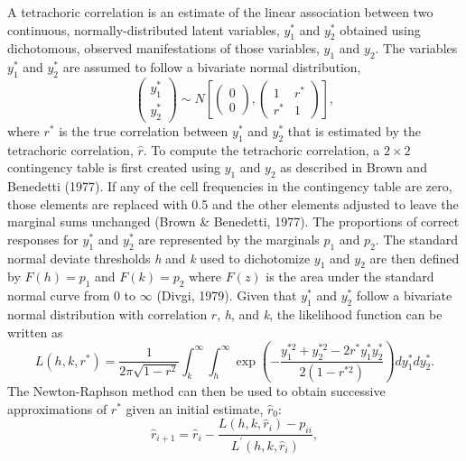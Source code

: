 \documentclass[
  english,
  man]{apa6}
\begin{document}
A tetrachoric correlation is an estimate of the linear association between two continuous, normally-distributed latent variables, \(y_1^*\) and \(y_2^*\) obtained using dichotomous, observed manifestations of those variables, \(y_1\) and \(y_2\). The variables \(y_1^*\) and \(y_2^*\) are assumed to follow a bivariate normal distribution,
\[
\left(\begin{array}{l}
y_{1}^* \\
y_{2}^*
\end{array}\right) \sim N\left[\left(\begin{array}{l}
0 \\
0
\end{array}\right),\left(\begin{array}{cc}
1 & r^* \\
r^* & 1
\end{array}\right)\right],
\]
where \(r^*\) is the true correlation between \(y_1^*\) and \(y_2^*\) that is estimated by the tetrachoric correlation, \(\hat{r}\). To compute the tetrachoric correlation, a \(2 \times 2\) contingency table is first created using \(y_1\) and \(y_2\) as described in Brown and Benedetti (1977). If any of the cell frequencies in the contingency table are zero, those elements are replaced with 0.5 and the other elements adjusted to leave the marginal sums unchanged (Brown \& Benedetti, 1977). The proportions of correct responses for \(y_1^*\) and \(y_2^*\) are represented by the marginals \(p_1\) and \(p_2\). The standard normal deviate thresholds \emph{h} and \emph{k} used to dichotomize \(y_1\) and \(y_2\) are then defined by \(F(h) = p_1\) and \(F(k) = p_2\) where \(F(z)\) is the area under the standard normal curve from 0 to \(\infty\) (Divgi, 1979). Given that \(y_1^*\) and \(y_2^*\) follow a bivariate normal distribution with correlation \(r\), \emph{h}, and \emph{k}, the likelihood function can be written as
\begin{equation}
L(h, k, r^{*})=\frac{1}{2 \pi \sqrt{1-r^{2}}} \int_{k}^{\infty} \int_{h}^{\infty} \exp \left(-\frac{y_1^{*2}+y_2^{*2}-2 r^* y_1^* y_2^*}{2\left(1-r^{*2}\right)}\right) d y_1^* d y_2^*.
\label{eq:likelihood-fn}
\end{equation}
The Newton-Raphson method can then be used to obtain successive approximations of \(r^*\) given an initial estimate, \(\hat{r}_0\):
\[
\hat{r}_{i + 1} = \hat{r}_i - \frac{L(h,k,\hat{r}_i) - p_{ii}}{L^\prime(h,k,\hat{r}_i)},
\]
\end{document}
